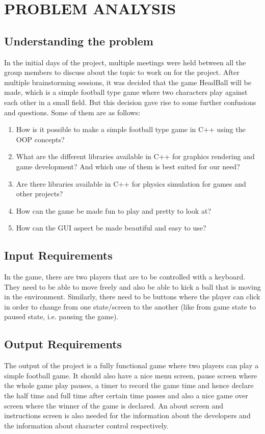 \documentclass[main]{subfiles}
\begin{document}
\chapter{PROBLEM ANALYSIS}

\section{Understanding the problem}

In the initial days of the project, multiple meetings were held between all the group members to discuss about the topic to work on for the project. After multiple brainstorming sessions, it was decided that the game HeadBall will be made, which is a simple football type game where two characters play against each other in a small field. But this decision gave rise to some further confusions and questions. Some of them are as follows:

\begin{enumerate}
    \item How is it possible to make a simple football type game in C++ using the OOP concepts?
    
    \item What are the different libraries available in C++ for graphics rendering and game development? And which one of them is best suited for our need?
    
    \item Are there libraries available in C++ for physics simulation for games and other projects?
    
    \item How can the game be made fun to play and pretty to look at?
    
    \item How can the GUI aspect be made beautiful and easy to use?
\end{enumerate}
	
\section{Input Requirements}
In the game, there are two players that are to be controlled with a keyboard. They need to be able to move freely and also be able to kick a  ball that is moving in the environment. Similarly, there need to be buttons where the player can click in order to change from one state/screen to the another (like from game state to paused state, i.e. pausing the game).
	
\section{Output Requirements}
The output of the project is a fully functional game where two players can play a simple football game. It should also have a nice menu screen, pause screen where the whole game play pauses, a timer to record the game time and hence declare the half time and full time after certain time passes and also a nice game over screen where the winner of the game is declared. An about screen and instructions screen is also needed for the information about the developers and the information about character control respectively.
	
\end{document}
